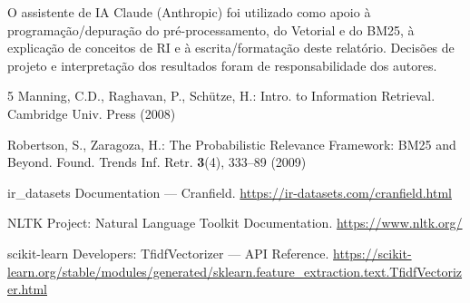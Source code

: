 \documentclass[runningheads]{llncs}
\begin{document}
O assistente de IA Claude (Anthropic) foi utilizado como apoio à programação/depuração do pré-processamento, do Vetorial e do BM25, à explicação de conceitos de RI e à escrita/formatação deste relatório. Decisões de projeto e interpretação dos resultados foram de responsabilidade dos autores.

\vspace{-1.0em}
%
\begin{thebibliography}{5}
\fontsize{8.5}{9.5}\selectfont
\setlength{\itemsep}{0pt}
Manning, C.D., Raghavan, P., Schütze, H.: Intro. to Information Retrieval. Cambridge Univ. Press (2008)

Robertson, S., Zaragoza, H.: The Probabilistic Relevance Framework: BM25 and Beyond. Found. Trends Inf. Retr. \textbf{3}(4), 333--89 (2009)

ir\_datasets Documentation --- Cranfield. \url{https://ir-datasets.com/cranfield.html}

NLTK Project: Natural Language Toolkit Documentation. \url{https://www.nltk.org/}

scikit-learn Developers: TfidfVectorizer --- API Reference. \url{https://scikit-learn.org/stable/modules/generated/sklearn.feature_extraction.text.TfidfVectorizer.html}
\end{thebibliography}
\end{document}
